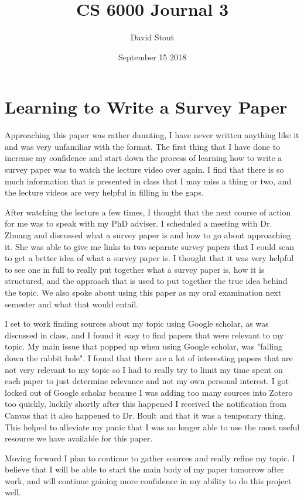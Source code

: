 \documentclass{article}
\title{CS 6000 Journal 3}
\author{David Stout}
\date{September 15 2018}
\begin{document}
\maketitle

\section{Learning to Write a Survey Paper}
Approaching this paper was rather daunting, I have never written anything like it and was very unfamiliar with the 
format. The first thing that I have done to increase my confidence and start down the process of learning how to write a 
survey paper was to watch the lecture video over again. I find that there is so much information that is presented in 
class that I may miss a thing or two, and the lecture videos are very helpful in filling in the gaps.

After watching the lecture a few times, I thought that the next course of action for me was to speak with my PhD adviser.
I scheduled a meeting with Dr. Zhuang and discussed what a survey paper is and how to go about approaching it. She was 
able to give me links to two separate survey papers that I could scan to get a better idea of what a survey paper is. I 
thought that it was very helpful to see one in full to really put together what a survey paper is, how it is structured, 
and the approach that is used to put together the true idea behind the topic. We also spoke about using this paper as my 
oral examination next semester and what that would entail. 

I set to work finding sources about my topic using Google scholar, as was discussed in class, and I found it easy to find
papers that were relevant to my topic. My main issue that popped up when using Google scholar, was "falling down the 
rabbit hole". I found that there are a lot of interesting papers that are not very relevant to my topic so I had to 
really try to limit my time spent on each paper to just determine relevance and not my own personal interest. I got 
locked out of Google scholar because I was adding too many sources into Zotero too quickly, luckily shortly after this 
happened I received the notification from Canvas that it also happened to Dr. Boult and that it was a temporary thing. 
This helped to alleviate my panic that I was no longer able to use the most useful resource we have available for this 
paper.

Moving forward I plan to continue to gather sources and really refine my topic. I believe that I will be able to start 
the main body of my paper tomorrow after work, and will continue gaining more confidence in my ability to do this project
well.
\end{document}
